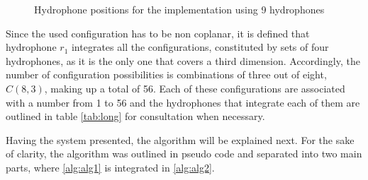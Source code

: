 \begin{figure}[!htbp]
	
	\captionsetup{justification=centering,margin=2cm}
	\caption{Hydrophone positions for the implementation using 9 hydrophones}
	\label{fig:9h-config}
\end{figure}

Since the used configuration has to be non coplanar, it is defined that hydrophone $r_1$ integrates all the configurations, constituted by sets of four hydrophones, as it is the only one that covers a third dimension. Accordingly, the number of configuration possibilities is combinations of three out of eight, $C(8,3)$, making up a total of 56. Each of these configurations are associated with a number from 1 to 56 and the hydrophones that integrate each of them are outlined in table \ref{tab:long} for consultation when necessary.

Having the system presented, the algorithm will be explained next. For the sake of clarity, the algorithm was outlined in pseudo code and separated into two main parts, where \ref{alg:alg1} is integrated in \ref{alg:alg2}.

